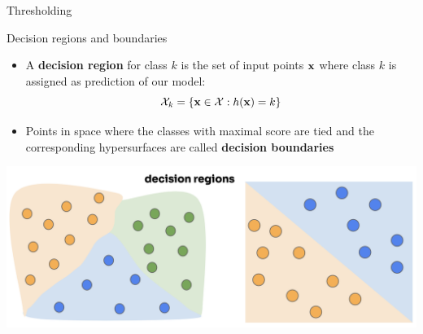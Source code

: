 \documentclass[11pt,compress,t,notes=noshow, xcolor=table]{beamer}
\begin{document}
\begin{frame}{Thresholding}

\end{frame} 

\begin{vbframe}{Decision regions and boundaries}
\begin{itemize}
  \item A \textbf{decision region} for class $k$ is the set of input points $\mathbf{x}$ where class $k$ is assigned as prediction of our model:
$$
\mathcal{X}_k = \{\mathbf{x} \in \mathcal{X} : h(\mathbf{x}) = k\}
$$

\item Points in space where the classes with maximal score are tied and the corresponding hypersurfaces are called \textbf{decision boundaries}
\end{itemize}

\begin{center}
  \includegraphics{figure_man/decision_regions.png} 
\end{center}
\end{vbframe} 
\end{document}
